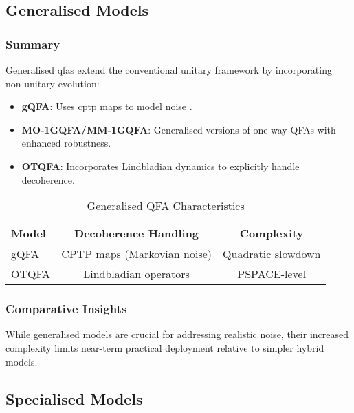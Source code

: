 \subsection*{Generalised Models}

\subsubsection{Summary}
Generalised \glspl{qfa} extend the conventional unitary framework by incorporating non-unitary evolution:
\begin{itemize}
    \item \textbf{gQFA}: Uses \gls{cptp} maps to model noise \cite{gruska2005}.
    \item \textbf{MO-1GQFA/MM-1GQFA}: Generalised versions of one-way QFAs with enhanced robustness.
    \item \textbf{OTQFA}: Incorporates Lindbladian dynamics to explicitly handle decoherence.
\end{itemize}

\begin{table}[ht]
\centering
\label{tab:general}
\begin{tabular}{|l|c|c|}
\hline
\textbf{Model} & \textbf{Decoherence Handling} & \textbf{Complexity} \\ \hline
gQFA   & CPTP maps (Markovian noise) & Quadratic slowdown \\ \hline
OTQFA & Lindbladian operators & PSPACE-level \\ \hline
\end{tabular}
\caption{Generalised QFA Characteristics}
\end{table}

\subsubsection{Comparative Insights}
While generalised models are crucial for addressing realistic noise, their increased complexity limits near-term practical deployment relative to simpler hybrid models.

\subsection*{Specialised Models}

